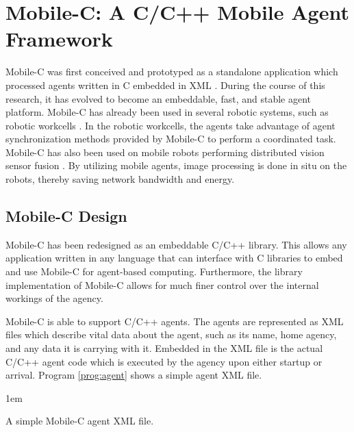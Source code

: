   \section{Mobile-C: A C/C++ Mobile Agent Framework} %
    Mobile-C was first conceived and prototyped as a standalone application which
      processed agents written in C embedded in XML \cite{chen2005}. 
    During the course of this research, it has evolved to become an embeddable,
      fast, and stable agent platform. 
    Mobile-C has already been used in several robotic systems, such as robotic
      workcells \cite{Nestinge2010b}. 
    In the robotic workcells, the agents take advantage of agent
      synchronization methods provided by Mobile-C to perform a coordinated task.
    Mobile-C has also been used on mobile robots performing distributed vision
      sensor fusion \cite{Nestinge2010}. 
    By utilizing mobile agents, image processing is done in situ on the robots,
      thereby saving network bandwidth and energy.

    \subsection{Mobile-C Design} %
      Mobile-C has been redesigned as an embeddable C/C++ library. 
      This allows any application written in any language that can interface
        with C libraries to embed and use Mobile-C for agent-based computing.
      Furthermore, the library implementation of Mobile-C allows for much finer
        control over the internal workings of the agency.

      Mobile-C is able to support C/C++ agents. 
      The agents are represented as XML files which describe vital data
        about the agent, such as its name, home agency, and any data
        it is carrying with it.
      Embedded in the XML file is the actual C/C++ agent code which is 
        executed by the agency upon either startup or arrival.
      Program \ref{prog:agent} shows a simple agent XML file.
      

      \begin{Program}
        \footnotesize{\baselineskip 1em }
        \caption{\label{prog:agent} A simple Mobile-C agent XML file.}
      \end{Program}

